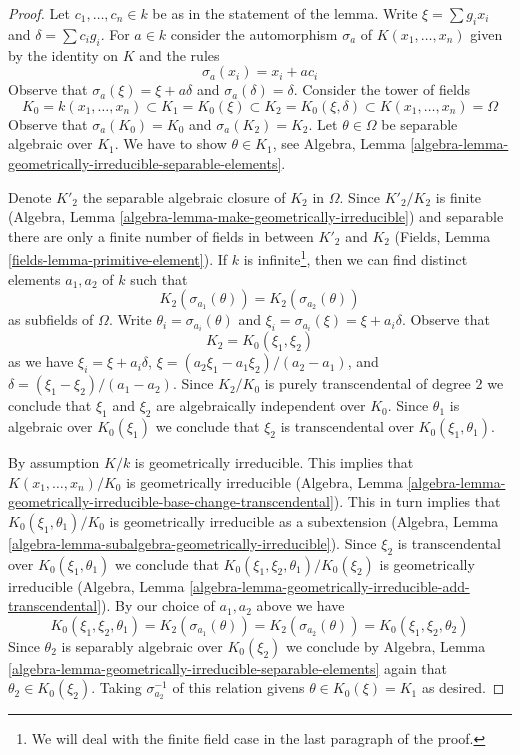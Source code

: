 \begin{proof}
Let $c_1, \ldots, c_n \in k$ be as in the statement of the lemma.
Write $\xi = \sum g_ix_i$ and $\delta = \sum c_ig_i$.
For $a \in k$ consider the automorphism $\sigma_a$
of $K(x_1, \ldots, x_n)$ given by the identity on $K$ and the rules
$$
\sigma_a(x_i) = x_i + a c_i
$$
Observe that $\sigma_a(\xi) = \xi + a \delta$ and $\sigma_a(\delta) = \delta$.
Consider the tower of fields
$$
K_0 = k(x_1, \ldots, x_n) \subset
K_1 = K_0(\xi) \subset
K_2 = K_0(\xi, \delta) \subset K(x_1, \ldots, x_n) = \Omega
$$
Observe that $\sigma_a(K_0) = K_0$ and $\sigma_a(K_2) = K_2$.
Let $\theta \in \Omega$ be separable algebraic over $K_1$.
We have to show $\theta \in K_1$, see Algebra, Lemma
\ref{algebra-lemma-geometrically-irreducible-separable-elements}.

\medskip\noindent
Denote $K'_2$ the separable algebraic closure of $K_2$ in $\Omega$.
Since $K'_2/K_2$ is finite (Algebra, Lemma
\ref{algebra-lemma-make-geometrically-irreducible}) and
separable there are only a finite number of fields in
between $K'_2$ and $K_2$ (Fields, Lemma \ref{fields-lemma-primitive-element}).
If $k$ is infinite\footnote{We will deal with the finite field case in the
last paragraph of the proof.}, then we can find distinct elements
$a_1, a_2$ of $k$ such that
$$
K_2(\sigma_{a_1}(\theta)) = K_2(\sigma_{a_2}(\theta))
$$
as subfields of $\Omega$. Write $\theta_i = \sigma_{a_i}(\theta)$
and $\xi_i = \sigma_{a_i}(\xi) = \xi + a_i \delta$. Observe that
$$
K_2 = K_0(\xi_1, \xi_2)
$$
as we have $\xi_i = \xi + a_i \delta$,
$\xi = (a_2 \xi_1 - a_1 \xi_2)/(a_2 - a_1)$, and
$\delta = (\xi_1 - \xi_2)/(a_1 - a_2)$.
Since $K_2/K_0$ is purely transcendental of degree $2$ we conclude
that $\xi_1$ and $\xi_2$ are algebraically independent over $K_0$.
Since $\theta_1$ is algebraic over $K_0(\xi_1)$ we conclude that
$\xi_2$ is transcendental over $K_0(\xi_1, \theta_1)$.

\medskip\noindent
By assumption $K/k$ is geometrically irreducible. This implies
that $K(x_1, \ldots, x_n)/K_0$ is geometrically irreducible
(Algebra, Lemma
\ref{algebra-lemma-geometrically-irreducible-base-change-transcendental}).
This in turn implies that $K_0(\xi_1, \theta_1)/K_0$
is geometrically irreducible as a subextension
(Algebra, Lemma \ref{algebra-lemma-subalgebra-geometrically-irreducible}).
Since $\xi_2$ is transcendental over $K_0(\xi_1, \theta_1)$
we conclude that $K_0(\xi_1, \xi_2, \theta_1)/K_0(\xi_2)$
is geometrically irreducible (Algebra, Lemma
\ref{algebra-lemma-geometrically-irreducible-add-transcendental}).
By our choice of $a_1, a_2$ above we have
$$
K_0(\xi_1, \xi_2, \theta_1) =
K_2(\sigma_{a_1}(\theta)) =
K_2(\sigma_{a_2}(\theta)) =
K_0(\xi_1, \xi_2, \theta_2)
$$
Since $\theta_2$ is separably algebraic over $K_0(\xi_2)$
we conclude by Algebra, Lemma
\ref{algebra-lemma-geometrically-irreducible-separable-elements} again that
$\theta_2 \in K_0(\xi_2)$. Taking $\sigma_{a_2}^{-1}$
of this relation givens $\theta \in K_0(\xi) = K_1$ as desired.


\end{proof}

